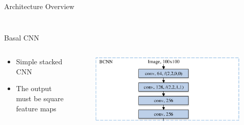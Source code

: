 \documentclass[compress]{beamer}
\begin{document}
\begin{frame}{Architecture Overview}
\begin{columns}
\begin{column}[T]{.5\textwidth}
\begin{figure}
            \end{figure}
        \end{column}
    \end{columns}
\end{frame}

\begin{frame}{Basal CNN}
    \begin{columns}
        \begin{column}[T]{.5\textwidth}
            \begin{itemize}
                \item Simple stacked CNN 
                \item The output must be square feature maps
            \end{itemize}
        \end{column}
        \begin{column}[T]{.5\textwidth}
            \begin{figure}
                \includegraphics[width=\textwidth,height=.4\textheight]{bcnn}
            \end{figure}
        \end{column}
    \end{columns}
\end{frame}
\end{document}
